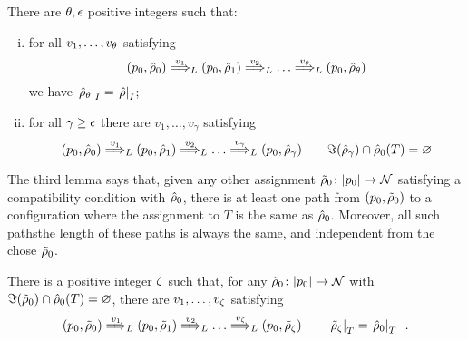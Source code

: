 %

\begin{lemma} There are $\theta,\epsilon$ positive integers such that:
\label{lem:IT}
\begin{enumerate}[(i)]

\item
for all $v_1,\dots,v_\theta$ satisfying
\[
	(p_0,\hat{\rho}_0) \overset{v_1}{\Longrightarrow}_{L} (p_0,\hat{\rho}_1) \overset{v_2}{\Longrightarrow}_{L} \dots \overset{v_{\theta}}{\Longrightarrow}_{L} (p_0,\hat{\rho}_\theta)
\]
we have $\left. \hat{\rho}_\theta \right|_{I} = \left. \hat{\rho} \right|_{I}$;
\label{idI}

\item %
for all $\gamma \geq \epsilon$ there are $v_1,\dots,v_\gamma$ satisfying
\[
	(p_0,\hat{\rho}_0) \overset{v_1}{\Longrightarrow}_{L} (p_0,\hat{\rho}_1) \overset{v_2}{\Longrightarrow}_{L} \dots \overset{v_\gamma}{\Longrightarrow}_{L} (p_0,\hat{\rho}_\gamma)
	\qquad 
	\Im(\hat{\rho}_\gamma) \cap \hat{\rho}_0(T) = \varnothing
\]
\label{forgetT}
\end{enumerate}
\end{lemma}
%
%
The third lemma says that, given any other assignment $\tilde{\rho}_0 \colon |p_0| \to \mathcal{N}$ satisfying a compatibility condition with $\hat{\rho}_0$, there is at least one path from $(p_0,\tilde{\rho}_0)$ to a configuration where the assignment to $T$ is the same as $\hat{\rho}_0$. Moreover, all such pathsthe length of these paths is always the same, and independent from the chose $\tilde{\rho}_0$.


%
\begin{lemma}
There is a positive integer $\zeta$ such that,
for any $\tilde{\rho}_0 \colon |p_0| \to \mathcal{N}$ with $\Im(\tilde{\rho}_0) \cap \hat{\rho}_0(T) = \varnothing$, there are $v_1,\dots,v_\zeta$ satisfying
\[
	(p_0,\tilde{\rho}_0) \overset{v_1}{\Longrightarrow}_{L} (p_0,\tilde{\rho}_1) \overset{v_2}{\Longrightarrow}_{L} \dots \overset{v_\zeta}{\Longrightarrow}_{L} (p_0,\tilde{\rho}_\zeta)	
	\qquad
	\left.\tilde{\rho}_\zeta\right|_{T} = \left.\hat{\rho}_0\right|_{T} \enspace .
\]
\label{lem:initT}
\end{lemma}


